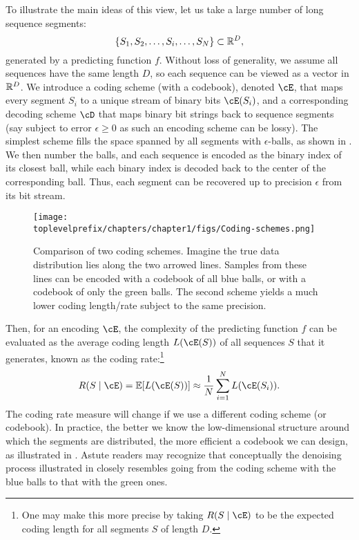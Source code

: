 \documentclass[../../book-main.tex]{subfiles}
\begin{document}
To illustrate the main ideas of this view, let us take a large number of long sequence segments:
\begin{equation}
    \{S_{1}, S_{2}, \ldots, S_{i}, \ldots, S_{N}\} \subset \mathbb{R}^{D},
\end{equation}
generated by a predicting function \(f\). Without loss of generality, we assume all sequences have the same length \(D\), so each sequence can be viewed as a vector in \(\mathbb{R}^{D}\). We introduce a coding scheme (with a codebook), denoted \(\cE\), that maps every segment \(S_{i}\) to a unique stream of binary bits \(\cE(S_{i})\), and a corresponding decoding scheme \(\cD\) that maps binary bit strings back to sequence segments (say subject to error \(\epsilon \geq 0\) as such an encoding scheme can be lossy). The simplest scheme fills the space spanned by all segments with \(\epsilon\)-balls, as shown in . We then number the balls, and each sequence is encoded as the binary index of its closest ball, while each binary index is decoded back to the center of the corresponding ball. Thus, each segment can be recovered up to precision \(\epsilon\) from its bit stream.
\begin{figure}
    \centering
    \texttt{[image: \\toplevelprefix/chapters/chapter1/figs/Coding-schemes.png]}
    \caption{Comparison of two coding schemes. Imagine the true data distribution lies along the two arrowed lines. Samples from these lines can be encoded with a codebook of all blue balls, or with a codebook of only the green balls. The second scheme yields a much lower coding length/rate subject to the same precision.}
    \label{fig:coding-schemes}
\end{figure}


Then, for an encoding \(\cE\), the complexity of the predicting function \(f\) can be evaluated as the average coding length \(L(\cE(S))\) of all sequences \(S\) that it generates, known as the coding rate:\footnote{One may make this more precise by taking \(R(S \mid \cE)\) to be the expected coding length for all segments \(S\) of length \(D\).}
\begin{equation}
   R(S \mid \cE) = \Ex[L(\cE(S))] \approx \frac{1}{N}\sum_{i=1}^{N} L(\cE(S_{i})). 
   \label{eqn:coding-rate}
\end{equation}
The coding rate measure will change if we use a different coding scheme (or codebook). In practice, the better we know the low-dimensional structure around which the segments are distributed, the more efficient a codebook we can design, as illustrated in . Astute readers may recognize that conceptually the denoising process illustrated in  closely resembles going from the coding scheme with the blue balls to that with the green ones.
\end{document}
